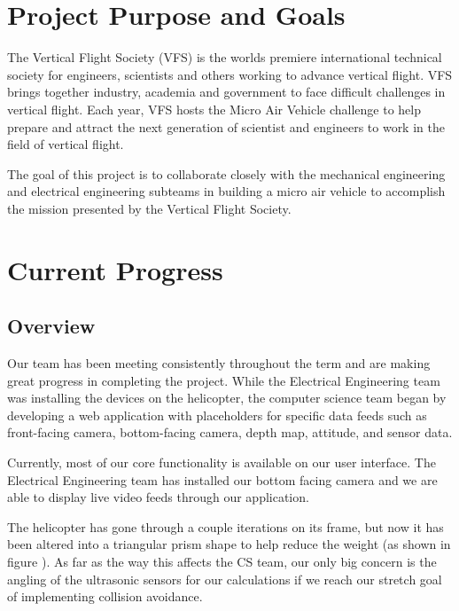 \documentclass[onecolumn, oneside, letterpaper, draftclsnofoot, 10pt, compsoc]{IEEEtran}
\begin{document}
\section{Project Purpose and Goals}
The Vertical Flight Society (VFS) is the world\textquotesingle s premiere international technical society for engineers, scientists and others working to advance vertical flight. VFS brings together industry, academia and government to face difficult challenges in vertical flight. Each year, VFS hosts the Micro Air Vehicle challenge to help prepare and attract the next generation of scientist and engineers to work in the field of vertical flight.

\noindent
\newline
The goal of this project is to collaborate closely with the mechanical engineering and electrical engineering subteams in building a micro air vehicle to accomplish the mission presented by the Vertical Flight Society.


\section{Current Progress}
\subsection{Overview}
Our team has been meeting consistently throughout the term and are making great progress in completing the project. While the Electrical Engineering team was installing the devices on the helicopter, the computer science team began by developing a web application with placeholders for specific data feeds such as front-facing camera, bottom-facing camera, depth map, attitude, and sensor data.

\noindent
\newline
Currently, most of our core functionality is available on our user interface. The Electrical Engineering team has installed our bottom facing camera and we are able to display live video feeds through our application.

\noindent
\newline
The helicopter has gone through a couple iterations on its frame, but now it has been altered into a triangular prism shape to help reduce the weight (as shown in figure ). As far as the way this affects the CS team, our only big concern is the angling of the ultrasonic sensors for our calculations if we reach our stretch goal of implementing collision avoidance.
\end{document}
